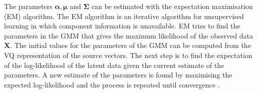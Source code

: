 The parameters $\boldsymbol{\alpha}, \boldsymbol{\mu}$ and $ \mathbf{\Sigma}$ can be estimated with the expectation maximisation (EM) algorithm. The EM algorithm is an iterative algorithm for unsupervised learning in which component information is unavailable. EM tries to find the parameters in the GMM that gives the maximum likelihood of the observed data $\mathbf{X}$. The initial values for the parameters of the GMM can be computed from the VQ representation of the source vectors. The next step is to find the expectation of the log-likelihood of the latent data given the current estimate of the parameters. A new estimate of the parameters is found by maximising the expected log-likelihood and the process is repeated until convergence \cite{taletek}.


% 
% 
% 

